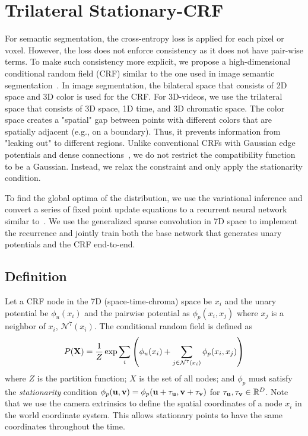 \section{Trilateral Stationary-CRF}
\label{sec:crf}

For semantic segmentation, the cross-entropy loss is applied for each pixel or voxel. However, the loss does not enforce consistency as it does not have pair-wise terms. To make such consistency more explicit, we propose a high-dimensional conditional random field (CRF) similar to the one used in image semantic segmentation~\cite{crfasrnn}. In image segmentation, the bilateral space that consists of 2D space and 3D color is used for the CRF. For 3D-videos, we use the trilateral space that consists of 3D space, 1D time, and 3D chromatic space. The color space creates a "spatial" gap between points with different colors that are spatially adjacent (e.g., on a boundary). Thus, it prevents information from "leaking out" to different regions. Unlike conventional CRFs with Gaussian edge potentials and dense connections~\cite{densecrf,crfasrnn}, we do not restrict the compatibility function to be a Gaussian. Instead, we relax the constraint and only apply the stationarity condition.

To find the global optima of the distribution, we use the variational inference and convert a series of fixed point update equations to a recurrent neural network similar to~\cite{crfasrnn}. We use the generalized sparse convolution in 7D space to implement the recurrence and jointly train both the base network that generates unary potentials and the CRF end-to-end.


\subsection{Definition}

Let a CRF node in the 7D (space-time-chroma) space be $x_i$ and the unary potential be $\phi_u(x_i)$ and the pairwise potential as $\phi_p(x_i, x_j)$ where $x_j$ is a neighbor of $x_i$, $\mathcal{N}^7(x_i)$. The conditional random field is defined as
\begin{equation*}
    P(\mathbf{X}) = \frac{1}{Z} \exp{ \sum_i \left( \phi_u(x_i) + \sum_{j \in \mathcal{N}^7(x_i)} \phi_p(x_i, x_j)\right)}
\end{equation*}
where $Z$ is the partition function; $X$ is the set of all nodes; and $\phi_p$ must satisfy the \textit{stationarity} condition $\phi_p(\mathbf{u}, \mathbf{v}) = \phi_p(\mathbf{u} + \mathbf{\tau_u}, \mathbf{v} + \mathbf{\tau_v})$ for $\mathbf{\tau_u}, \mathbf{\tau_v} \in \mathbb{R}^D$. Note that we use the camera extrinsics to define the spatial coordinates of a node $x_i$ in the world coordinate system. This allows stationary points to have the same coordinates throughout the time.

